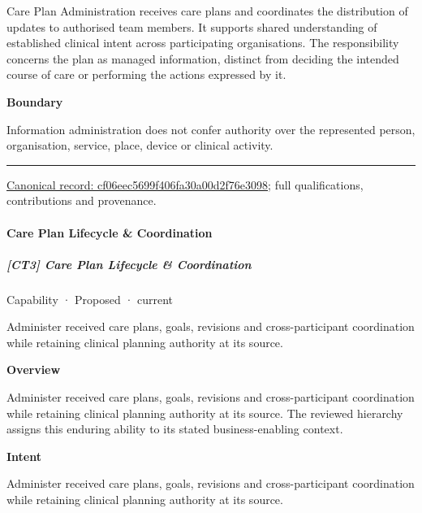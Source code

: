 Care Plan Administration receives care plans and coordinates the distribution of updates to authorised team members. It supports shared understanding of established clinical intent across participating organisations. The responsibility concerns the plan as managed information, distinct from deciding the intended course of care or performing the actions expressed by it.



\textbf{Boundary}



Information administration does not confer authority over the represented person, organisation, service, place, device or clinical activity.



\medskip\hrule\medskip

{\footnotesize \href{../../../../continuum/strategy/capability/cf06eec5699f406fa30a00d2f76e3098.md}{Canonical record: cf06eec5699f406fa30a00d2f76e3098}; full qualifications, contributions and provenance.}\par
\paragraph{Care Plan Lifecycle \& Coordination}

\subparagraph{[CT3] Care Plan Lifecycle \& Coordination}

\label{element:4cb7db65392f4fab801d7794af4d4b29}
{\small Capability · Proposed · current}\par

Administer received care plans, goals, revisions and cross-participant coordination while retaining clinical planning authority at its source.



\textbf{Overview}



Administer received care plans, goals, revisions and cross-participant coordination while retaining clinical planning authority at its source. The reviewed hierarchy assigns this enduring ability to its stated business-enabling context.



\textbf{Intent}



Administer received care plans, goals, revisions and cross-participant coordination while retaining clinical planning authority at its source.



